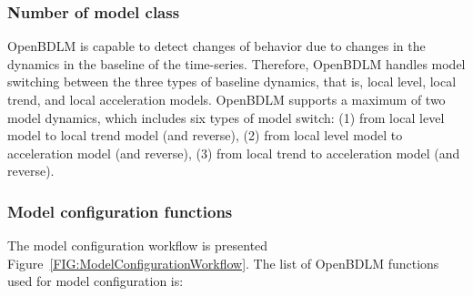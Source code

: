 \subsubsection{Number of model class}

OpenBDLM is capable to detect changes of behavior due to changes in the dynamics in the baseline of the time-series. 
Therefore, OpenBDLM handles model switching between the three types of baseline dynamics, that is, local level, local trend, and local acceleration models. 
OpenBDLM supports a maximum of two model dynamics, which includes six types of model switch: (1) from local level model to local trend model (and reverse), (2) from local level model to acceleration model (and reverse), (3) from local trend to acceleration model (and reverse).


\subsubsection{Model configuration functions}

The model configuration workflow is presented Figure~\ref{FIG:ModelConfigurationWorkflow}. The list of OpenBDLM functions used for model configuration is:

